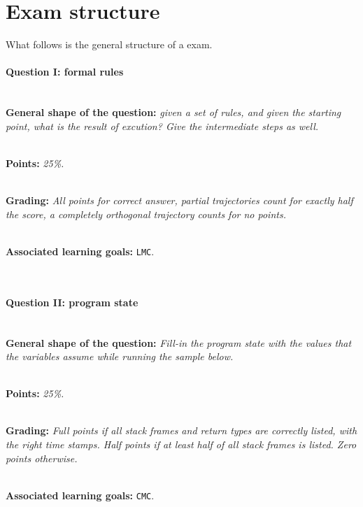 \section*{Exam structure}
What follows is the general structure of a \modulecode exam.

\paragraph{Question I: formal rules} \ \\

\textbf{General shape of the question:} \textit{given a set of rules, and given the starting point, what is the result of excution? Give the intermediate steps as well.}

\ \\ 

\textbf{Points:} \textit{25\%.}

\ \\ 

\textbf{Grading:} \textit{All points for correct answer, partial trajectories count for exactly half the score, a completely orthogonal trajectory counts for no points.}

\ \\ 

\textbf{Associated learning goals:} \texttt{LMC}.

\ \\ 

\paragraph{Question II: program state} \ \\ 

\textbf{General shape of the question:} \textit{Fill-in the program state with the values that the variables assume while running the sample below.}

\ \\ 

\textbf{Points:} \textit{25\%.}

\ \\ 

\textbf{Grading:} \textit{Full points if all stack frames and return types are correctly listed, with the right time stamps. Half points if at least half of all stack frames is listed. Zero points otherwise.}

\ \\ 

\textbf{Associated learning goals:} \texttt{CMC}.


